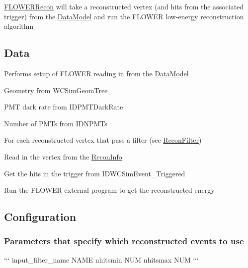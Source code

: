 \hyperlink{classFLOWERRecon}{F\-L\-O\-W\-E\-R\-Recon} will take a reconstructed vertex (and hits from the associated trigger) from the \hyperlink{classDataModel}{Data\-Model} and run the F\-L\-O\-W\-E\-R low-\/energy reconstruction algorithm

\subsection*{Data}


\begin{DoxyItemize}
\item Performs setup of F\-L\-O\-W\-E\-R reading in from the \hyperlink{classDataModel}{Data\-Model}
\begin{DoxyItemize}
\item Geometry from {\ttfamily W\-C\-Sim\-Geom\-Tree}
\item P\-M\-T dark rate from {\ttfamily I\-D\-P\-M\-T\-Dark\-Rate}
\item Number of P\-M\-Ts from {\ttfamily I\-D\-N\-P\-M\-Ts}
\end{DoxyItemize}
\item For each reconstructed vertex that pass a filter (see {\ttfamily \hyperlink{classReconFilter}{Recon\-Filter}})
\begin{DoxyItemize}
\item Read in the vertex from the {\ttfamily \hyperlink{classReconInfo}{Recon\-Info}}
\item Get the hits in the trigger from {\ttfamily I\-D\-W\-C\-Sim\-Event\-\_\-\-Triggered}
\item Run the F\-L\-O\-W\-E\-R external program to get the reconstructed energy
\end{DoxyItemize}
\end{DoxyItemize}

\subsection*{Configuration}

\subsubsection*{Parameters that specify which reconstructed events to use}

``` input\-\_\-filter\-\_\-name N\-A\-M\-E nhitsmin N\-U\-M nhitsmax N\-U\-M ```


